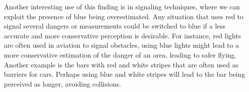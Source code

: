 Another interesting use of this finding is in signaling techniques, where we can exploit the presence of blue being overestimated.  Any situation that uses red to signal several dangers or measurements could be switched to blue if a less accurate and more conservative perception is desirable. For instance, red lights are often used in aviation to signal obstacles, using blue lights might lead to a more conservative estimation of the danger of an area, leading to safer flying. Another example is the bars with red and white stripes that are often used as barriers for cars. Perhaps using blue and white stripes will lead to the bar being perceived as longer, avoiding collisions.

